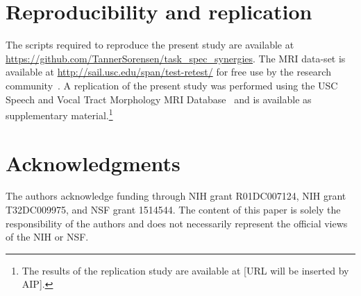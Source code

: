 \documentclass[preprint]{JASAnew}\usepackage[]{graphicx}\usepackage[]{color}
\begin{document}
\section{Reproducibility and replication}

The scripts required to reproduce the present study are available at \url{https://github.com/TannerSorensen/task_spec_synergies}.
%
The MRI data-set is available at \url{http://sail.usc.edu/span/test-retest/} for free use by the research community~\citep[see][]{toger2017test}.
%
A replication of the present study was performed using the USC Speech and Vocal Tract Morphology MRI Database~\citep{sorensen2017database} and is available as supplementary material.\footnote{The results of the replication study are available at [URL will be inserted by AIP].}

\section{Acknowledgments} 

The authors acknowledge funding through NIH grant R01DC007124, NIH grant T32DC009975, and NSF grant 1514544. The content of this paper is solely the responsibility of the authors and does not necessarily represent the official views of the NIH or NSF.


\end{document}
